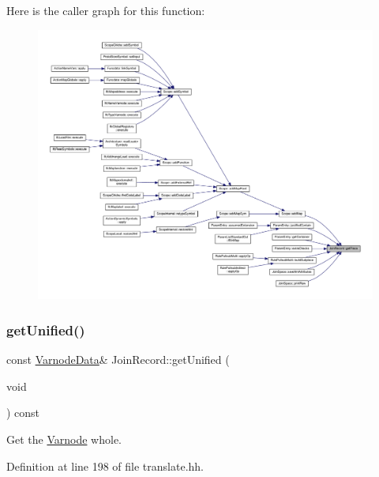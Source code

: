 Here is the caller graph for this function\+:
\nopagebreak
\begin{figure}[H]
\begin{center}
\leavevmode
\includegraphics[width=350pt]{class_join_record_a5d3feebaadef123349cda1564717b9d7_icgraph}
\end{center}
\end{figure}
\mbox{\label{class_join_record_a71e39715b107db55fa5c737457877b3a}} 
\subsubsection{\texorpdfstring{getUnified()}{getUnified()}}
{\footnotesize\ttfamily const \mbox{\hyperlink{struct_varnode_data}{Varnode\+Data}}\& Join\+Record\+::get\+Unified (\begin{DoxyParamCaption}\item[{void}]{ }\end{DoxyParamCaption}) const\hspace{0.3cm}{\ttfamily [inline]}}



Get the \mbox{\hyperlink{class_varnode}{Varnode}} whole. 



Definition at line 198 of file translate.\+hh.

